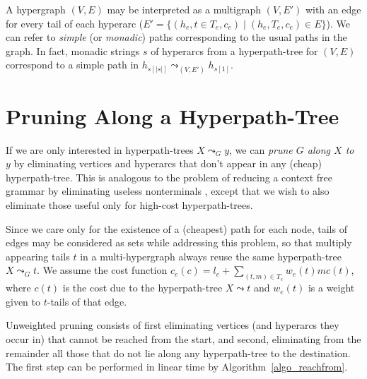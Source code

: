 \documentclass[english]{article}
\newcommand\st{\;|\;}
\newcommand\algref[1]{Algorithm~\ref{#1}}
\begin{document}
  A hypergraph $(V,E)$ may be interpreted as a multigraph $(V,E')$ with an edge for every
  tail of each hyperarc ($E'=\{(h_e,t\in T_e,c_e)\st (h_e,T_e,c_e)\in E\}$).  We can
  refer to \emph{simple} (or \emph{monadic}) paths corresponding to the usual
  paths in the graph.  In fact, monadic strings $s$ of hyperarcs from a hyperpath-tree
  for $(V,E)$ correspond to a simple path in $h_{s[|s|]}\leadsto_{(V,E')}h_{s[1]}$.

  \section{Pruning Along a Hyperpath-Tree}

  If we are only interested in hyperpath-trees $X\leadsto_G y$, we can \emph{prune
    $G$ along $X$ to $y$} by eliminating vertices and hyperarcs that don't
  appear in any (cheap) hyperpath-tree.  This is analogous to the problem of reducing
  a context free grammar by eliminating useless nonterminals \cite{hopcroft},
  except that we wish to also eliminate those useful only for high-cost
  hyperpath-trees.

  Since we care only for the existence of a (cheapest) path for each node, tails
  of edges may be considered as sets while addressing this problem, so that
  multiply appearing tails $t$ in a multi-hypergraph always reuse the same
  hyperpath-tree $X\leadsto_G t$.  We assume the cost function $c_e(c)=l_e+\sum_{(t,m)\in
    T_e}w_e(t)mc(t)$, where $c(t)$ is the cost due to the hyperpath-tree $X\leadsto
  t$ and $w_e(t)$ is a weight given to $t$-tails of that edge.

  Unweighted pruning consists of first eliminating vertices (and hyperarcs they
  occur in) that cannot be reached from the start, and second, eliminating from
  the remainder all those that do not lie along any hyperpath-tree to the destination.
  The first step can be performed in linear time by \algref{algo_reachfrom}.
\end{document}
